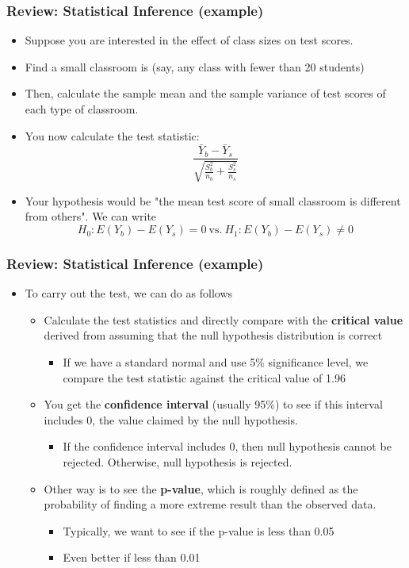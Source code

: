 \documentclass[aspectratio=169]{beamer}
\begin{document}
\begin{frame}
\frametitle{Review: Statistical Inference (example)}
\begin{itemize}
\item Suppose you are interested in the effect of class sizes on test scores. 
\item Find a small classroom is (say, any class with fewer than 20 students) 
\item Then, calculate the sample mean and the sample variance of test scores of each type of classroom. 
\item You now calculate the test statistic: 
\[ 
\frac{\bar{Y}_b-\bar{Y}_s}{\sqrt{\frac{S_b^2}{n_b}+\frac{S_s^2}{n_s}}}
\]
\item Your hypothesis would be "the mean test score of small classroom is different from others". We can write
\[
H_0: E(Y_b)-E(Y_s) = 0\ \text{vs.}\ H_1:E(Y_b)-E(Y_s) \neq 0
\]
\end{itemize}
\end{frame}

\begin{frame}
\frametitle{Review: Statistical Inference (example)}
\begin{itemize}
\item To carry out the test, we can do as follows
\begin{itemize}
\item Calculate the test statistics and directly compare with the \textbf{critical value} derived from assuming that the null hypothesis distribution is correct
\begin{itemize}
\item If we have a standard normal and use 5\% significance level, we compare the test statistic against the critical value of 1.96
\end{itemize}
\item You get the \textbf{confidence interval} (usually 95\%) to see if this interval includes 0, the value claimed by the null hypothesis. 
\begin{itemize}
\item If the confidence interval includes 0, then null hypothesis cannot be rejected. Otherwise, null hypothesis is rejected.
\end{itemize}
\item Other way is to see the \textbf{p-value}, which is roughly defined as the probability of finding a more extreme result than the observed data.
\begin{itemize}
\item Typically, we want to see if the p-value is less than 0.05 
\item Even better if less than 0.01
\end{itemize}
\end{itemize}
\end{itemize}
\end{frame}
\end{document}
